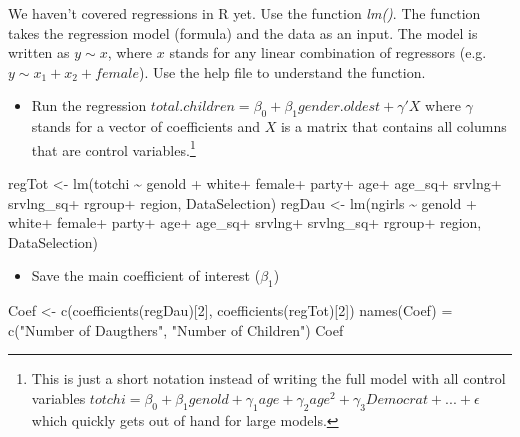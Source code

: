 \documentclass[
]{article}
\newenvironment{Shaded}{\begin{snugshade}}{\end{snugshade}}
\newcommand{\DecValTok}[1]{\textcolor[rgb]{0.00,0.00,0.81}{#1}}
\newcommand{\FunctionTok}[1]{\textcolor[rgb]{0.00,0.00,0.00}{#1}}
\newcommand{\NormalTok}[1]{#1}
\newcommand{\OtherTok}[1]{\textcolor[rgb]{0.56,0.35,0.01}{#1}}
\newcommand{\SpecialCharTok}[1]{\textcolor[rgb]{0.00,0.00,0.00}{#1}}
\newcommand{\StringTok}[1]{\textcolor[rgb]{0.31,0.60,0.02}{#1}}
\providecommand{\tightlist}{%
  \setlength{\itemsep}{0pt}\setlength{\parskip}{0pt}}
\begin{document}
We haven't covered regressions in R yet. Use the function \emph{lm()}.
The function takes the regression model (formula) and the data as an
input. The model is written as \(y \sim x\), where \(x\) stands for any
linear combination of regressors (e.g.~\(y \sim x_1 + x_2 + female\)).
Use the help file to understand the function.

\begin{itemize}
\tightlist
\item
  Run the regression
  \(total.children = \beta_0 + \beta_1 gender.oldest + \gamma'X\) where
  \(\gamma\) stands for a vector of coefficients and \(X\) is a matrix
  that contains all columns that are control
  variables.\footnote{This is just a short notation instead of writing the full model with all control variables $totchi = \beta_0 + \beta_1 genold + \gamma_1 age + \gamma_2 age^2 + \gamma_3 Democrat + ... + \epsilon$ which quickly gets out of hand for large models.}
\end{itemize}

\begin{Shaded}
\begin{Highlighting}[]
\NormalTok{regTot }\OtherTok{\textless{}{-}} \FunctionTok{lm}\NormalTok{(totchi }\SpecialCharTok{\textasciitilde{}}\NormalTok{ genold }\SpecialCharTok{+}\NormalTok{ white}\SpecialCharTok{+}\NormalTok{ female}\SpecialCharTok{+}\NormalTok{ party}\SpecialCharTok{+}\NormalTok{ age}\SpecialCharTok{+}\NormalTok{ age\_sq}\SpecialCharTok{+}\NormalTok{ srvlng}\SpecialCharTok{+}\NormalTok{ srvlng\_sq}\SpecialCharTok{+}\NormalTok{ rgroup}\SpecialCharTok{+}\NormalTok{ region, DataSelection)}
\NormalTok{regDau }\OtherTok{\textless{}{-}} \FunctionTok{lm}\NormalTok{(ngirls }\SpecialCharTok{\textasciitilde{}}\NormalTok{ genold }\SpecialCharTok{+}\NormalTok{ white}\SpecialCharTok{+}\NormalTok{ female}\SpecialCharTok{+}\NormalTok{ party}\SpecialCharTok{+}\NormalTok{ age}\SpecialCharTok{+}\NormalTok{ age\_sq}\SpecialCharTok{+}\NormalTok{ srvlng}\SpecialCharTok{+}\NormalTok{ srvlng\_sq}\SpecialCharTok{+}\NormalTok{ rgroup}\SpecialCharTok{+}\NormalTok{ region, DataSelection)}
\end{Highlighting}
\end{Shaded}

\begin{itemize}
\tightlist
\item
  Save the main coefficient of interest (\(\beta_1\))
\end{itemize}

\begin{Shaded}
\begin{Highlighting}[]
\NormalTok{Coef }\OtherTok{\textless{}{-}} \FunctionTok{c}\NormalTok{(}\FunctionTok{coefficients}\NormalTok{(regDau)[}\DecValTok{2}\NormalTok{], }\FunctionTok{coefficients}\NormalTok{(regTot)[}\DecValTok{2}\NormalTok{])}
\FunctionTok{names}\NormalTok{(Coef) }\OtherTok{=} \FunctionTok{c}\NormalTok{(}\StringTok{"Number of Daugthers"}\NormalTok{, }\StringTok{"Number of Children"}\NormalTok{)}
\NormalTok{Coef}
\end{Highlighting}
\end{Shaded}
\end{document}
